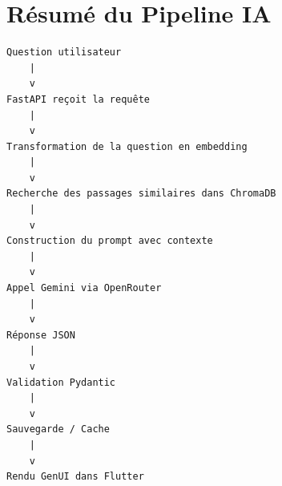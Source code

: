 \documentclass[12pt,a4paper]{report}
\begin{document}
\chapter{Résumé du Pipeline IA}

\begin{verbatim}
Question utilisateur
    |
    v
FastAPI reçoit la requête
    |
    v
Transformation de la question en embedding
    |
    v
Recherche des passages similaires dans ChromaDB
    |
    v
Construction du prompt avec contexte
    |
    v
Appel Gemini via OpenRouter
    |
    v
Réponse JSON
    |
    v
Validation Pydantic
    |
    v
Sauvegarde / Cache
    |
    v
Rendu GenUI dans Flutter
\end{verbatim}
\end{document}
